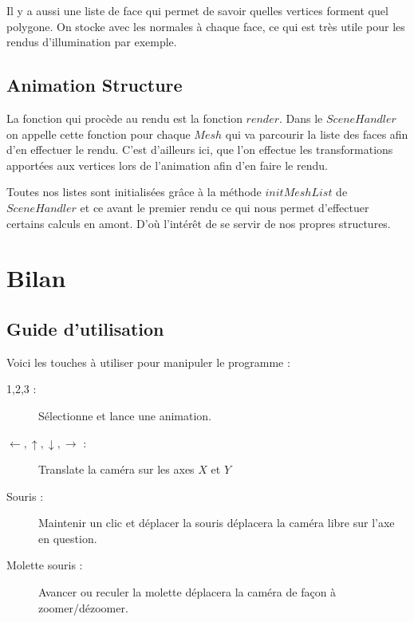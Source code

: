 \documentclass[a4paper]{report}
\begin{document}
\par
Il y a aussi une liste de face qui permet de savoir quelles vertices forment quel polygone. On stocke avec les normales à chaque face, ce qui est très utile pour les rendus d'illumination par exemple.

    \section{Animation Structure}

\par
La fonction qui procède au rendu est la fonction $render$. Dans le $SceneHandler$ on appelle cette fonction pour chaque $Mesh$ qui va parcourir la liste des faces afin d'en effectuer le rendu. C'est d'ailleurs ici, que l'on effectue les transformations apportées aux vertices lors de l'animation afin d'en faire le rendu.

\par
Toutes nos listes sont initialisées grâce à la méthode $initMeshList$ de $SceneHandler$ et ce avant le premier rendu ce qui nous permet d'effectuer certains calculs en amont. D'où l'intérêt de se servir de nos propres structures.

\newpage
\chapter{Bilan}
\section{Guide d'utilisation}
Voici les touches à utiliser pour manipuler le programme :
\begin{description}
	\item[1,2,3 :] Sélectionne et lance une animation.
	\item[$\leftarrow,\uparrow,\downarrow,\rightarrow$ :] Translate la caméra sur les axes $X$ et $Y$
	\item[Souris :] Maintenir un clic et déplacer la souris déplacera la caméra libre sur l'axe en question.
	\item[Molette souris :] Avancer ou reculer la molette déplacera la caméra de façon à zoomer/dézoomer.
\end{description}
\end{document}
